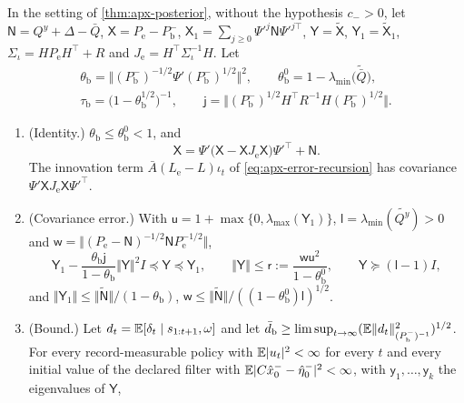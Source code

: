 \begin{theorem}\label{thm:apx-unconditional}
In the setting of \cref{thm:apx-posterior}, without the hypothesis $c_->0$, let $\mathsf N=Q^y+\Delta-\bar Q$, $\mathsf X=P_{\mathrm e}-P^-_{\mathrm b}$, $\mathsf X_1=\sum_{j\ge0}\Psi'^j\mathsf N\Psi'^{j\top}$, $\mathsf Y=\tilde{\mathsf X}$, $\mathsf Y_1=\tilde{\mathsf X}_1$, $\Sigma_\iota=HP_{\mathrm e}H^\top+R$ and $J_{\mathrm e}=H^\top\Sigma_\iota^{-1}H$. Let
\begin{equation*}
\begin{gathered}
\theta_{\mathrm b}=\bigl\Vert(P^-_{\mathrm b})^{-1/2}\Psi'(P^-_{\mathrm b})^{1/2}\bigr\Vert^2,\qquad\theta^0_{\mathrm b}=1-\lambda_{\min}\bigl(\tilde{\bar Q}\bigr),\\
\tau_{\mathrm b}=\bigl(1-\theta_{\mathrm b}^{1/2}\bigr)^{-1},\qquad\mathsf j=\bigl\Vert(P^-_{\mathrm b})^{1/2}H^\top R^{-1}H(P^-_{\mathrm b})^{1/2}\bigr\Vert .
\end{gathered}
\end{equation*}
\begin{enumerate}
\item[(a)] (Identity.) $\theta_{\mathrm b}\le\theta^0_{\mathrm b}<1$, and
\begin{equation}\label{eq:apx-quadratic}
\mathsf X=\Psi'\bigl(\mathsf X-\mathsf XJ_{\mathrm e}\mathsf X\bigr)\Psi'^\top+\mathsf N .
\end{equation}
The innovation term $\bar A(L_{\mathrm e}-L)\iota_t$ of \cref{eq:apx-error-recursion} has covariance $\Psi'\mathsf XJ_{\mathrm e}\mathsf X\Psi'^\top$.
\item[(b)] (Covariance error.) With $\mathsf u=1+\max\{0,\lambda_{\max}(\mathsf Y_1)\}$, $\mathsf l=\lambda_{\min}(\tilde{Q^y})>0$ and $\mathsf w=\Vert(P_{\mathrm e}-\mathsf N)^{-1/2}\mathsf NP_{\mathrm e}^{-1/2}\Vert$,
\begin{equation}\label{eq:apx-enclosure}
\mathsf Y_1-\frac{\theta_{\mathrm b}\mathsf j}{1-\theta_{\mathrm b}}\Vert\mathsf Y\Vert^2I\preceq\mathsf Y\preceq\mathsf Y_1,\qquad\Vert\mathsf Y\Vert\le\mathsf r:=\frac{\mathsf w\mathsf u^2}{1-\theta^0_{\mathrm b}},\qquad\mathsf Y\succeq(\mathsf l-1)I ,
\end{equation}
and $\Vert\mathsf Y_1\Vert\le\Vert\tilde{\mathsf N}\Vert/(1-\theta_{\mathrm b})$, $\mathsf w\le\Vert\tilde{\mathsf N}\Vert/((1-\theta^0_{\mathrm b})\mathsf l)^{1/2}$.
\item[(c)] (Bound.) Let $d_t=\mathbb{E}[\delta_t\mid s_{1:t+1},\omega]$ and let $\bar d_{\mathrm b}\ge\limsup_{t\to\infty}(\mathbb{E}\Vert d_t\Vert^2_{(P^-_{\mathrm b})^{-1}})^{1/2}$. For every record-measurable policy with $\mathbb{E}\lvert u_t\rvert^2<\infty$ for every $t$ and every initial value of the declared filter with $\mathbb{E}\lvert C\hat x^-_0-\hat\eta^-_0\rvert^2<\infty$, with $\mathsf y_1,\dots,\mathsf y_k$ the eigenvalues of $\mathsf Y$,

\end{enumerate}
\end{theorem}

